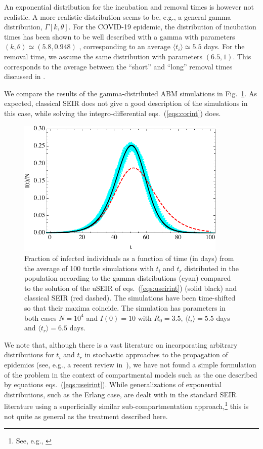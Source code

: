 \documentclass[10pt,letterpaper]{article}
\begin{document}
 An exponential distribution for the incubation and removal times is however not realistic. A more realistic distribution seems to be, e.g., a general gamma distribution, $\Gamma[k,\theta]$. 
For the COVID-19 epidemic, the distribution of incubation times has been shown to be well described with a gamma with parameters $(k,\theta) \simeq (5.8, 0.948)$ \cite{Hellewell2020}, corresponding to an average $\langle t_i\rangle \simeq 5.5$ days. For the removal time, we assume the same distribution with parameters $(6.5,1)$. This corresponds to the average between the ``short'' and ``long'' removal times discussed in \cite{Hellewell2020}.

We compare the results of the gamma-distributed ABM simulations in Fig.~\ref{fig:expvsgamma}. As expected, classical SEIR does not give a good description of the simulations in this case, while solving the integro-differential eqs.~(\ref{eqs:corint}) does. 
\begin{figure}[h!]
  \centering
  \includegraphics[width=10cm]{GGvsSEIRshift.pdf}
  \caption{ Fraction of infected individuals as a function of time (in days) from the average of 100 turtle simulations with $t_i$ and $t_r$ distributed in the population according to the gamma distributions (cyan) compared to the solution of the uSEIR of eqs.~(\ref{eqs:useirint}) (solid black) and classical SEIR (red dashed). The simulations have been time-shifted so that their maxima coincide. The simulation has parameters in both cases $N=10^4$ and $I(0)=10$ with $R_0=3.5$, $\langle t_i\rangle=5.5$ days and $\langle t_r\rangle=6.5$ days.  }
  \label{fig:expvsgamma}
   \end{figure}
   
We note that, although there is a vast literature on incorporating arbitrary distributions for $t_i$ and $t_r$
in stochastic approaches to the propagation of epidemics (see, e.g., a recent review in~\cite{stocrev}), we have not found {a} simple formulation  of the problem in the context of compartmental models such as the one described by equations eqs.~(\ref{eqs:useirint}).
While generalizations of exponential distributions, such as the Erlang case, are dealt with
in the standard SEIR literature using a superficially similar sub-compartmentation approach,\footnote{See, e.g.,
\cite{Lloyd2001,Lloyd2001b,Wearing2005,Conlan2009,Krylova2013}} this is not quite as general
as the treatment described here.
\end{document}
